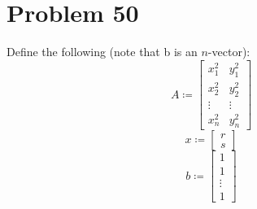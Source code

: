 \documentclass{article}
\begin{document}
\section*{Problem 50}
Define the following (note that b is an $n$-vector):
$$A \coloneqq \begin{bmatrix} x_1^2 & y_1^2 \\ x_2^2 & y_2^2  \\ \vdots & \vdots \\ x_n^2 & y_n^2 \end{bmatrix}$$
$$x \coloneqq \begin{bmatrix} r \\ s \end{bmatrix}$$
$$b \coloneqq \begin{bmatrix} 1 \\ 1 \\ \vdots \\ 1 \end{bmatrix}$$
\end{document}

